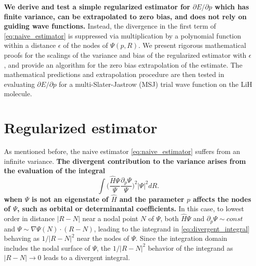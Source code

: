 \documentclass{article}
\begin{document}
\textbf{We derive and test a simple regularized estimator for $\partial E/\partial p$ which has finite variance, can be extrapolated to zero bias, and does not rely on guiding wave functions.}
Instead, the divergence in the first term of \eqref{eq:naive_estimator} is suppressed via multiplication by a polynomial function within a distance $\epsilon$ of the nodes of $\Psi(p, R)$. 
We present rigorous mathematical proofs for the scalings of the variance and bias of the regularized estimator with $\epsilon$, and provide an algorithm for the zero bias extrapolation of the estimate.
The mathematical predictions and extrapolation procedure are then tested in evaluating $\partial E/\partial p$ for a multi-Slater-Jastrow (MSJ) trial wave function on the LiH molecule.

\section{Regularized estimator}
As mentioned before, the naive estimator \eqref{eq:naive_estimator} suffers from an infinite variance. 
\textbf{The divergent contribution to the variance arises from the evaluation of the integral
\begin{equation}
\int \Big(\frac{\hat{H}\Psi}{\Psi}\frac{\partial_p\Psi}{\Psi}\Big)^2 |\Psi|^2 dR.
\label{eq:divergent_integral}
\end{equation}
when $\Psi$ is not an eigenstate of $\hat{H}$ and the parameter $p$ affects the nodes of $\Psi$, such as orbital or determinantal coefficients.}
In this case, to lowest order in distance $|R-N|$ near a nodal point $N$ of $\Psi$, both $\hat{H}\Psi$ and $\partial_p \Psi \sim const$ and $\Psi \sim \nabla \Psi(N) \cdot (R - N)$, leading to the integrand in \eqref{eq:divergent_integral} behaving as $1/|R-N|^2$ near the nodes of $\Psi$.
Since the integration domain includes the nodal surface of $\Psi$, the $1/|R-N|^2$ behavior of the integrand as $|R-N|\rightarrow 0$ leads to a divergent integral.
\end{document}
